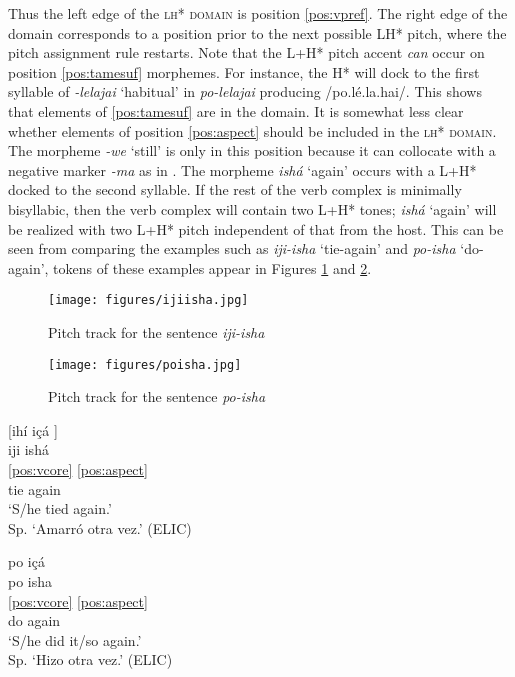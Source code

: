\documentclass[output=paper,hidelinks]{langscibook}
\begin{document}
Thus the left edge of the \textsc{lh* domain} is position \ref{pos:vpref}. The right edge of the domain corresponds to a position prior to the next possible LH* pitch, where the pitch assignment rule restarts. Note that the L+H* pitch accent \textit{can} occur on position \ref{pos:tamesuf} morphemes. For instance, the H* will dock to the first syllable of \textit{-lelajai} `habitual' in \textit{po-lelajai} producing /po.lé.la.hai/. This shows that elements of \ref{pos:tamesuf} are in the domain. It is somewhat less clear whether elements of position \ref{pos:aspect} should be included in the \textsc{lh* domain}. The morpheme \textit{-we} `still' is only in this position because it can collocate with a negative marker \textit{-ma} as in . The morpheme \textit{ishá} `again' occurs with a L+H* docked to the second syllable. If the rest of the verb complex is minimally bisyllabic, then the verb complex will contain two L+H* tones; \textit{ishá} `again' will be realized with two L+H* pitch independent of that from the host. This can be seen from comparing the examples such as \textit{iji-isha} `tie-again' and \textit{po-isha} `do-again', tokens of these examples appear in Figures \ref{fig:ijiisha} and \ref{fig:poisha}.



\begin{figure}
    \texttt{[image: figures/ijiisha.jpg]}
    \caption{Pitch track for the sentence \textit{\textit{iji-isha}}}
    \label{fig:ijiisha}
\end{figure}

\begin{figure}
    \texttt{[image: figures/poisha.jpg]}
    \caption{Pitch track for the sentence \textit{\textit{po-isha}}}
    \label{fig:poisha}
\end{figure}


\ea \label{ex:ijiisha}
	 [ihí içá \downarrow] \\	
	 \glll iji ishá  \\
   \ref{pos:vcore} \ref{pos:aspect}    \\
	  tie again \\
	\glt `S/he tied again.' \\ Sp. `Amarró otra vez.' \hfill (ELIC)
\z

\ea \label{ex:poisha}
	 po içá \downarrow \\	
	 \glll po isha   \\
   \ref{pos:vcore} \ref{pos:aspect}    \\
	 do again  \\
	\glt `S/he did it/so again.' \\ Sp. `Hizo otra vez.' \hfill (ELIC)
\z
\end{document}
